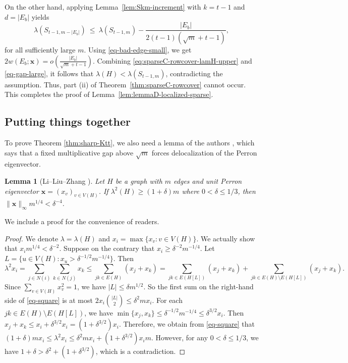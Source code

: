 \documentclass[11pt]{article}
\newtheorem{lemma}[theorem]{Lemma}
\theoremstyle{definition}
\theoremstyle{plain}
\begin{document}
On the other hand, applying Lemma~\ref{lem:Skm-increment} with $k=t-1$ and $d=|E_b|$ yields
\begin{equation} \label{eq-gap-large}
      \lambda(S_{t-1,m-|E_b|})
  \ \le\
  \lambda(S_{t-1,m})-\frac{|E_b|}{2(t-1)(\sqrt{m}+t-1)}, 
\end{equation} 
for all sufficiently large $m$.
Using \eqref{eq-bad-edge-small}, we get $2w(E_b; \bm{x})
        =
        o\!\left(\frac{|E_b|}{\sqrt{m}+t-1}\right).$
Combining \eqref{eq:sparseC-rowcover-lamH-upper} and \eqref{eq-gap-large}, it follows that $\lambda(H)<\lambda(S_{t-1,m})$, contradicting the assumption. Thus,  part \textup{(ii)} of Theorem~\ref{thm:sparseC-rowcover} cannot occur.  This completes the proof of Lemma~\ref{lem:lemmaD-localized-sparse}.


\subsection{Putting things together}

To prove Theorem \ref{thm:sharp-Ktt}, we also need a lemma of the authors \cite[Lemma 2.3]{LiLiuZhang2025EdgeSpectralESS}, which says that a fixed multiplicative gap above \(\sqrt m\) forces delocalization of the Perron eigenvector. 

\begin{lemma}[Li--Liu--Zhang \cite{LiLiuZhang2025EdgeSpectralESS}] \label{lem:max} 
Let $H$ be a graph with $m$ edges and unit Perron eigenvector \(\bm{x}=(x_v)_{v\in V(H)}\).  
 If $\lambda^2 (H) \ge (1+\delta)m$ where $0<\delta \le 1/3$, then 
$\|\bm{x}\|_{\infty} m^{1/4} < \delta^{-4}$.  
\end{lemma}

We include a proof for the convenience of readers. 

\begin{proof} 
    We denote $\lambda = \lambda(H)$ and 
    $x_i=\max\{x_v: v\in V(H)\}$. 
   We actually show that $x_i m^{1/4} < \delta^{-2}$. 
    Suppose on the contrary that $x_i \ge \delta^{-2}m^{-1/4}$. Let $L=\{u\in V(H): x_u > \delta^{-1/2}m^{-1/4}\}.$
     Then 
    \begin{equation} \label{eq-square}
        \lambda^2x_i
        =
        \sum_{j\in N(i)} \sum_{k\in N(j)} x_k 
        \le
        \sum_{jk\in E(H)} (x_j +x_k) 
        =
        \sum_{jk\in E(H[L])} (x_j+x_k) 
        +
        \sum_{jk\in E(H)\setminus E(H[L])} (x_j+x_k).
    \end{equation}
   Since $\sum_{v\in V(H)}x_v^2=1$, we have 
    $|L|\le \delta m^{1/2}$. So the first sum on the right-hand side of \eqref{eq-square} is at most $2x_i\binom{|L|}{2}\le \delta^2 mx_i.$
    For each $jk\in E(H)\setminus E(H[L])$, 
    we have $\min\{x_j,x_k\}\le \delta^{-1/2}m^{-1/4} \le \delta^{3/2}x_i$. 
    Then $x_j +x_k \le x_i + \delta^{3/2}x_i= 
        (1+ \delta^{3/2})x_i.$
    Therefore, we obtain from \eqref{eq-square} that $(1+\delta)m x_i
        \le
        \lambda^2 x_i
        \le 
        \delta^2 mx_i + (1+ \delta^{3/2})x_im.$
    However, for any $0< \delta \le 1/3$, we have 
    $1+ \delta > \delta^2 + (1+ \delta^{3/2})$, which is a contradiction. 
\end{proof}
\end{document}
